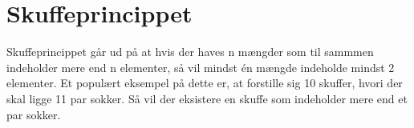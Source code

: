 \chapter{Skuffeprincippet}
Skuffeprincippet går ud på at hvis der haves n mængder som til sammmen indeholder mere end n elementer, så vil mindst én mængde indeholde mindst 2 elementer. 
Et populært eksempel på dette er, at forstille sig 10 skuffer, hvori der skal ligge 11 par sokker. Så vil der eksistere en skuffe som indeholder mere end et par sokker.  



